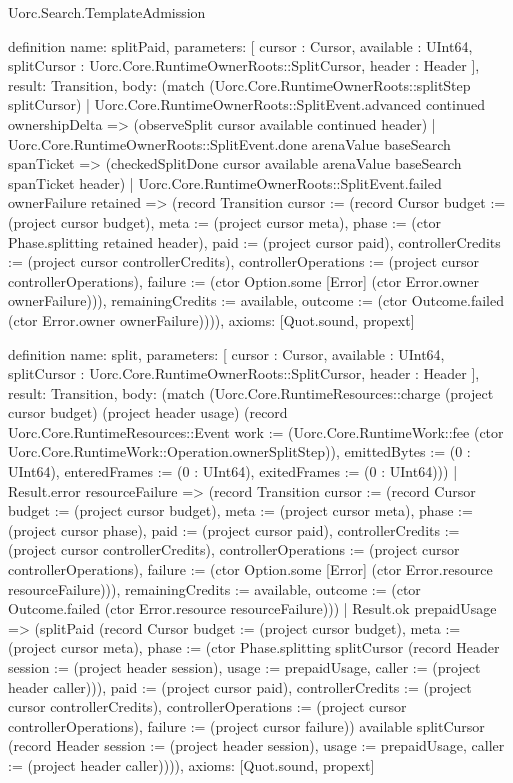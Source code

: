 \begin{lexlean}{Uorc.Search.TemplateAdmission}
\begin{semanticmodule}
definition{
  name: splitPaid,
  parameters: [
    cursor : Cursor,
    available : UInt64,
    splitCursor : Uorc.Core.RuntimeOwnerRoots::SplitCursor,
    header : Header
  ],
  result: Transition,
  body: (match (Uorc.Core.RuntimeOwnerRoots::splitStep splitCursor)
    | Uorc.Core.RuntimeOwnerRoots::SplitEvent.advanced continued ownershipDelta => (observeSplit cursor available continued header)
    | Uorc.Core.RuntimeOwnerRoots::SplitEvent.done arenaValue baseSearch spanTicket => (checkedSplitDone cursor available arenaValue baseSearch spanTicket header)
    | Uorc.Core.RuntimeOwnerRoots::SplitEvent.failed ownerFailure retained => (record Transition {cursor := (record Cursor {budget := (project cursor budget), meta := (project cursor meta), phase := (ctor Phase.splitting retained header), paid := (project cursor paid), controllerCredits := (project cursor controllerCredits), controllerOperations := (project cursor controllerOperations), failure := (ctor Option.some [Error] (ctor Error.owner ownerFailure))}), remainingCredits := available, outcome := (ctor Outcome.failed (ctor Error.owner ownerFailure))})),
  axioms: [Quot.sound, propext]
}

definition{
  name: split,
  parameters: [
    cursor : Cursor,
    available : UInt64,
    splitCursor : Uorc.Core.RuntimeOwnerRoots::SplitCursor,
    header : Header
  ],
  result: Transition,
  body: (match (Uorc.Core.RuntimeResources::charge (project cursor budget) (project header usage) (record Uorc.Core.RuntimeResources::Event {work := (Uorc.Core.RuntimeWork::fee (ctor Uorc.Core.RuntimeWork::Operation.ownerSplitStep)), emittedBytes := (0 : UInt64), enteredFrames := (0 : UInt64), exitedFrames := (0 : UInt64)}))
    | Result.error resourceFailure => (record Transition {cursor := (record Cursor {budget := (project cursor budget), meta := (project cursor meta), phase := (project cursor phase), paid := (project cursor paid), controllerCredits := (project cursor controllerCredits), controllerOperations := (project cursor controllerOperations), failure := (ctor Option.some [Error] (ctor Error.resource resourceFailure))}), remainingCredits := available, outcome := (ctor Outcome.failed (ctor Error.resource resourceFailure))})
    | Result.ok prepaidUsage => (splitPaid (record Cursor {budget := (project cursor budget), meta := (project cursor meta), phase := (ctor Phase.splitting splitCursor (record Header {session := (project header session), usage := prepaidUsage, caller := (project header caller)})), paid := (project cursor paid), controllerCredits := (project cursor controllerCredits), controllerOperations := (project cursor controllerOperations), failure := (project cursor failure)}) available splitCursor (record Header {session := (project header session), usage := prepaidUsage, caller := (project header caller)}))),
  axioms: [Quot.sound, propext]
}


\end{semanticmodule}
\end{lexlean}
